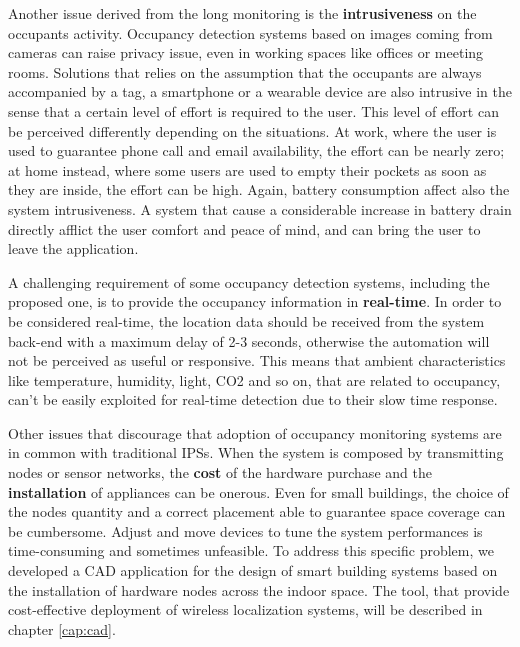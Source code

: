 \smallskip
Another issue derived from the long monitoring is the \textbf{intrusiveness} on the occupants activity. Occupancy detection systems based on images coming from cameras can raise privacy issue, even in working spaces like offices or meeting rooms.
Solutions that relies on the assumption that the occupants are always accompanied by a tag, a smartphone or a wearable device are also intrusive in the sense that a certain level of effort is required to the user. This level of effort can be perceived differently depending on the situations. At work, where the user is used to guarantee phone call and email availability, the effort can be nearly zero; at home instead, where some users are used to empty their pockets as soon as they are inside, the effort can be high.
Again, battery consumption affect also the system intrusiveness.
A system that cause a considerable increase in battery drain directly afflict the user comfort and peace of mind, and can bring the user to leave the application.

\smallskip
A challenging requirement of some occupancy detection systems, including the proposed one, is to provide the occupancy information in \textbf{real-time}. In order to be considered real-time, the location data should be received from the system back-end with a maximum delay of 2-3 seconds, otherwise the automation will not be perceived as useful or responsive. This means that ambient characteristics like temperature, humidity, light, CO2 and so on, that are related to occupancy, can't be easily exploited for real-time detection due to their slow time response.

\smallskip
Other issues that discourage that adoption of occupancy monitoring systems are in common with traditional IPSs. When the system is composed by transmitting nodes or sensor networks, the \textbf{cost} of the hardware purchase and the \textbf{installation} of appliances can be onerous. Even for small buildings, the choice of the nodes quantity and a correct placement able to guarantee space coverage can be cumbersome. Adjust and move devices to tune the system performances is time-consuming and sometimes unfeasible. To address this specific problem, we developed a CAD application for the design of smart building systems based on the installation of hardware nodes across the indoor space. The tool, that provide cost-effective deployment of wireless localization systems, will be described in chapter \ref{cap:cad}.

